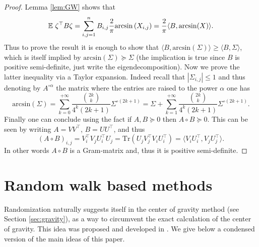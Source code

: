 \begin{proof}
Lemma \ref{lem:GW} shows that
$$\mathbb{E} \ \zeta^{\top} B \zeta = \sum_{i,j=1}^n B_{i,j} \frac{2}{\pi} \mathrm{arcsin} \left(X_{i,j}\right) = \frac{2}{\pi} \langle B, \mathrm{arcsin}(X) \rangle .$$
Thus to prove the result it is enough to show that $\langle B, \mathrm{arcsin}(\Sigma) \rangle \geq \langle B, \Sigma \rangle$, which is itself implied by $\mathrm{arcsin}(\Sigma) \succeq \Sigma$ (the implication is true since $B$ is positive semi-definite, just write the eigendecomposition). Now we prove the latter inequality via a Taylor expansion. Indeed recall that $|\Sigma_{i,j}| \leq 1$ and thus denoting by $A^{\circ \alpha}$ the matrix where the entries are raised to the power $\alpha$ one has
$$\mathrm{arcsin}(\Sigma) = \sum_{k=0}^{+\infty} \frac{{2k \choose k}}{4^k (2k +1)} \Sigma^{\circ (2k+1)} = \Sigma + \sum_{k=1}^{+\infty} \frac{{2k \choose k}}{4^k (2k +1)} \Sigma^{\circ (2k+1)}.$$
Finally one can conclude using the fact if $A,B \succeq 0$ then $A \circ B \succeq 0$. This can be seen by writing $A= V V^{\top}$, $B=U U^{\top}$, and thus 
$$(A \circ B)_{i,j} = V_i^{\top} V_j U_i^{\top} U_j = \mathrm{Tr}(U_j V_j^{\top} V_i U_i^{\top}) = \langle V_i U_i^{\top}, V_j U_j^{\top} \rangle .$$ In other words $A \circ B$ is a Gram-matrix and, thus it is positive semi-definite.
\end{proof}

\section{Random walk based methods} \label{sec:rwmethod}
Randomization naturally suggests itself in the center of gravity method (see Section \ref{sec:gravity}), as a way to circumvent the exact calculation of the center of gravity. This idea was proposed and developed in \cite{BerVem04}. We give below a condensed version of the main ideas of this paper.

